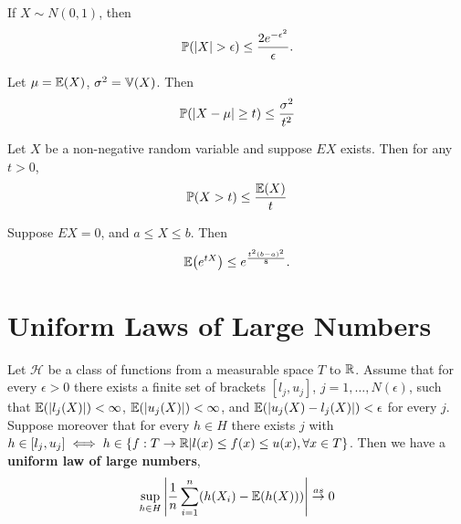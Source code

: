 \begin{thm}
  If $X \sim N(0, 1)$, then
  \begin{align}
    \label{eq:68}
    \Prob{|X| > \epsilon} \leq \frac{2e^{-\epsilon^{2}}}{\epsilon}.
  \end{align}
\end{thm}

\begin{thm}
  Let $\mu = \E{X}$, $\sigma^{2} = \Var{X}$. Then
  \begin{align}
    \label{eq:69}
    \Prob{|X - \mu | \geq t} \leq \frac{\sigma^{2}}{t^{2}}
  \end{align}
\end{thm}

\begin{thm}
  Let $X$ be a non-negative random variable and suppose $E{X}$ exists.
  Then for any $t > 0$,
  \begin{align}
    \label{eq:67}
    \Prob{X > t} \leq \frac{\E{X}}{t}
  \end{align}
\end{thm}

\begin{thm}
  Suppose $E{X} = 0$, and $a \leq X \leq b$. Then
  \begin{align}
    \label{eq:70}
    \E{e^{tX}} \leq e^{\frac{t^{2}(b-a)^{2}}{8}}.
  \end{align}
\end{thm}

\section{Uniform Laws of Large Numbers}
\label{sec:uniform-laws-large-1}

\begin{thm}
  Let $\mathcal{H}$ be a class of functions from a measurable space
  $T$ to $\mathbb{R}$. Assume that for every $\epsilon > 0$ there exists a
  finite set of brackets $[l_{j}, u_{j}]$, $j = 1, \dots,
  N(\epsilon)$, such that $\E{|l_{j}(X)|} < \infty$, $\E{|u_{j}(X)|} <
  \infty$, and $\E{|u_{j}(X) - l_{j}(X)|} < \epsilon$ for every $j$.
  Suppose moreover that for every $h \in H$ there exists $j$ with $h
  \in [l_{j}, u_{j}] \iff h \in \{ f: T \rightarrow \mathbb{R} | l(x) \leq
  f(x) \leq u(x), \forall x \in T \}$. Then we have a \textbf{uniform
    law of large numbers},
  \begin{equation}
    \label{eq:1}
    \sup_{h \in H} \left| \frac{1}{n} \sum_{i=1}^{n} (h(X_{i}) -
      \E{h(X)}) \right| \cas 0
  \end{equation}
\end{thm}

